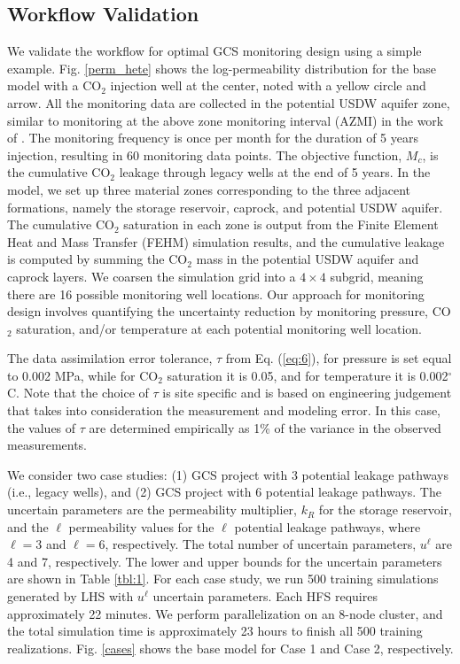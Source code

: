 \documentclass[a4paper,fleqn]{cas-sc}
\begin{document}
\subsection{Workflow Validation}
We validate the workflow for optimal GCS monitoring design using a simple example. Fig. \ref{perm_hete} shows the log-permeability distribution for the base model with a CO$_2$ injection well at the center, noted with a yellow circle and arrow. All the monitoring data are collected in the potential USDW aquifer zone, similar to monitoring at the above zone monitoring interval (AZMI) in the work of \citet{Sun2013}. The monitoring frequency is once per month for the duration of 5 years injection, resulting in 60 monitoring data points. The objective function, $M_c$, is the cumulative CO$_2$ leakage through legacy wells at the end of 5 years. In the model, we set up three material zones corresponding to the three adjacent formations, namely the storage reservoir, caprock, and potential USDW aquifer. The cumulative CO$_2$ saturation in each zone is output from the Finite Element Heat and Mass Transfer (FEHM) \citep{Zyvoloski1997} simulation results, and the cumulative leakage is computed by summing the CO$_2$ mass in the potential USDW aquifer and caprock layers. We coarsen the simulation grid into a $4\times 4$ subgrid, meaning there are 16 possible monitoring well locations. Our approach for monitoring design involves quantifying the uncertainty reduction by monitoring pressure, CO$_2$ saturation, and/or temperature at each potential monitoring well location. 

The data assimilation error tolerance, $\tau$ from Eq. (\ref{eq:6}), for pressure is set equal to 0.002 MPa, while for CO$_2$ saturation it is 0.05, and for temperature it is 0.002$^\circ$C. Note that the choice of $\tau$ is site specific and is based on engineering judgement that takes into consideration the measurement and modeling error. In this case, the values of $\tau$ are determined empirically as 1\% of the variance in the observed measurements.

We consider two case studies: (1) GCS project with 3 potential leakage pathways (i.e., legacy wells), and (2) GCS project with 6 potential leakage pathways. The uncertain parameters are the permeability multiplier, $k_R$ for the storage reservoir, and the $\ell$ permeability values for the $\ell$ potential leakage pathways, where $\ell=3$ and $\ell=6$, respectively. The total number of uncertain parameters, $u^\ell$ are 4 and 7, respectively. The lower and upper bounds for the uncertain parameters are shown in Table \ref{tbl:1}. For each case study, we run 500 training simulations generated by LHS with $u^\ell$ uncertain parameters. Each HFS requires approximately 22 minutes. We perform parallelization on an 8-node cluster, and the total simulation time is approximately 23 hours to finish all 500 training realizations. Fig. \ref{cases} shows the base model for Case 1 and Case 2, respectively.
\end{document}
